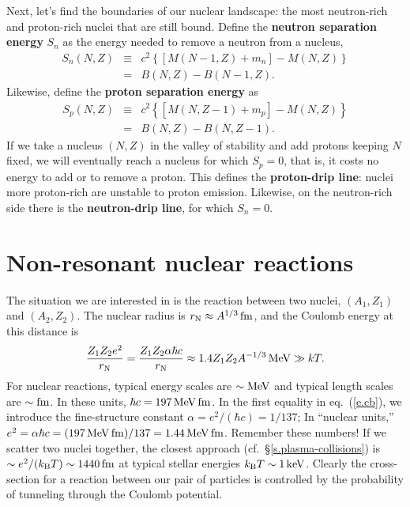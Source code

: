 Next, let's find the boundaries of our nuclear landscape: the most neutron-rich and proton-rich nuclei that are still bound.
Define the \textbf{neutron separation energy} $S_{n}$ as the energy needed to remove a neutron from a nucleus,
\begin{eqnarray}\label{e.Sn}
S_{n}(N,Z) &\equiv& c^{2}\left\{\left[M(N-1,Z) + m_{n}\right] - M(N,Z)\right\} \nonumber\\
	&=& B(N,Z) - B(N-1,Z).
\end{eqnarray}
Likewise, define the \textbf{proton separation energy} as
\begin{eqnarray}\label{e.Sp}
S_{p}(N,Z) &\equiv& c^{2}\left\{\left[M(N,Z-1) + m_{p}\right] - M(N,Z)\right\} \nonumber\\
	&=& B(N,Z) - B(N,Z-1).
\end{eqnarray}
If we take a nucleus $(N,Z)$ in the valley of stability and add protons keeping $N$ fixed, we will eventually reach a nucleus for which $S_{p} = 0$, that is, it costs no energy to add or to remove a proton.  This defines the \textbf{proton-drip line}: nuclei more proton-rich are unstable to proton emission. Likewise, on the neutron-rich side there is the \textbf{neutron-drip line}, for which $S_{n} = 0$.

\section{Non-resonant nuclear reactions}

The situation we are interested in is the reaction between two nuclei, $(A_{1},Z_{1})$ and $(A_{2},Z_{2})$.  The nuclear radius is $r_{\mathrm{N}}\approx  A^{1/3}\,\mathrm{fm}$, and the Coulomb energy at this distance is
\begin{equation}\label{e.cb}
\frac{Z_{1}Z_{2}e^{2}}{r_{\mathrm{N}}} = \frac{Z_{1}Z_{2}\alpha \hbar c}{ r_{\mathrm{N}}} \approx 1.4 Z_{1}Z_{2}A^{-1/3}\,\mathrm{M}\mathrm{eV}\gg kT.
\end{equation}
For nuclear reactions, typical energy scales  are $\sim\mathrm{M}\mathrm{eV}$ and typical length scales are $\sim\mathrm{fm}$.  In these units, $\hbar c = 197 \,\mathrm{M}\mathrm{eV}\,\mathrm{fm}$.  In the first equality in eq.~(\ref{e.cb}), we introduce the fine-structure constant $\alpha = e^{2}/(\hbar c) = 1/137$; In ``nuclear units,'' $e^{2} = \alpha \hbar c = (197\,\mathrm{M}\mathrm{eV}\,\mathrm{fm})/137 = 1.44\,\mathrm{M}\mathrm{eV}\,\mathrm{fm}$. Remember these numbers!  If we scatter two nuclei together, the closest approach (cf.~\S\ref{s.plasma-collisions}) is $\sim e^{2}/(k_\mathrm{B} T) \sim 1440\,\mathrm{fm}$ at typical stellar energies $k_\mathrm{B} T \sim 1\,\mathrm{k}\mathrm{eV}$.
Clearly the cross-section for a reaction between our pair of particles is controlled by the probability of tunneling through the Coulomb potential.

